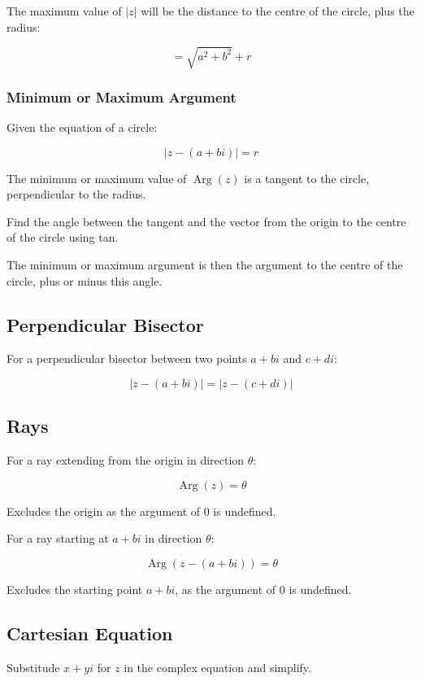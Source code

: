 \documentclass[a4paper,11pt]{article}
\DeclareMathOperator\Arg{Arg}
\begin{document}
The maximum value of $\lvert z \rvert$ will be the distance to the centre of
the circle, plus the radius:

$$
= \sqrt{a^2 + b^2} + r
$$


\subsubsection{Minimum or Maximum Argument}

Given the equation of a circle:

$$
\lvert z - (a + bi) \rvert = r
$$

The minimum or maximum value of $\Arg(z)$ is a tangent to the circle,
perpendicular to the radius.

Find the angle between the tangent and the vector from the origin to the centre
of the circle using tan.

The minimum or maximum argument is then the argument to the centre of the
circle, plus or minus this angle.


\subsection{Perpendicular Bisector}

For a perpendicular bisector between two points $a + bi$ and $c + di$:

$$
\lvert z - (a + bi) \rvert = \lvert z - (c + di) \rvert
$$


\subsection{Rays}

For a ray extending from the origin in direction $\theta$:

$$
\Arg(z) = \theta
$$

Excludes the origin as the argument of 0 is undefined.

For a ray starting at $a + bi$ in direction $\theta$:

$$
\Arg(z - (a + bi)) = \theta
$$

Excludes the starting point $a + bi$, as the argument of 0 is undefined.


\subsection{Cartesian Equation}

Substitude $x + yi$ for $z$ in the complex equation and simplify.
\end{document}
